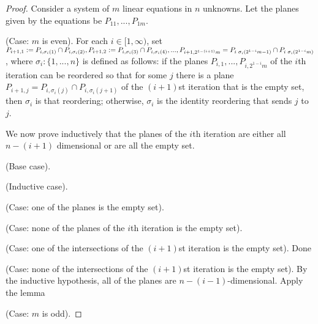 \begin{proof}
    
    Consider a system of $m$ linear equations in $n$ unknowns. Let the planes given by the equations be $P_{11}, ...,  P_{1m}$.
    
    (Case: $m$ is even). For each $i \in [1, \infty)$, set $P_{i + 1, 1} := P_{i, \sigma_i(1)} \cap P_{i, \sigma_i(2)}, P_{i + 1, 2} := P_{i, \sigma_i(3)} \cap P_{i, \sigma_i(4)}, ..., P_{i + 1, 2^{1 - (i + 1)} m} = P_{i \text{ } \sigma_i(2^{1 - i}m - 1)} \cap P_{i \text{ } \sigma_i(2^{1 - i}m)}$, where $\sigma_i:\{1, ..., n\}$ is defined as follows: if the planes $P_{i,1}, ..., P_{i,2^{1 - i}m}$ of the $i$th iteration can be reordered so that for some $j$ there is a plane ${P_{i + 1, j} = P_{i,\sigma_i(j)} \cap P_{i,\sigma_i(j + 1)}}$ of the $(i + 1)$st iteration that is the empty set, then $\sigma_i$ is that reordering; otherwise, $\sigma_i$ is the identity reordering that sends $j$ to $j$.

    We now prove inductively that the planes of the $i$th iteration are either all $n - (i + 1)$ dimensional or are all the empty set.

    (Base case).

    (Inductive case).

    \indent \indent (Case: one of the planes is the empty set). 
    
    \indent \indent (Case: none of the planes of the $i$th iteration is the empty set).

    \indent \indent \indent (Case: one of the intersections of the $(i + 1)$st iteration is the empty set). Done

    \indent \indent \indent (Case: none of the intersections of the $(i + 1)$st iteration is the empty set). By the inductive hypothesis, all of the planes are $n - (i - 1)$-dimensional. Apply the lemma
    
    (Case: $m$ is odd). 

        
    

\end{proof}

